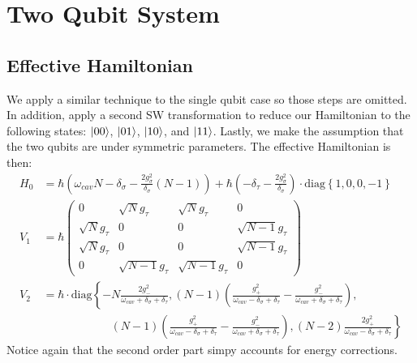 \documentclass[
    preprint,
    amsmath,amssymb,
    aps,
    prb,
    floatfix,
]{revtex4-2}
\begin{document}
    \section{Two Qubit System}
    \subsection{Effective Hamiltonian}
    We apply a similar technique to the single qubit case so those steps are omitted. In addition, apply a second SW transformation to reduce our Hamiltonian to the following states: $\ket{00}$, $\ket{01}$, $\ket{10}$, and $\ket{11}$. Lastly, we make the assumption that the two qubits are under symmetric parameters.
    The effective Hamiltonian is then:
    \begin{align}
        H_0 &= \hbar(\omega_{cav}N-\delta_\sigma-\frac{2g_\sigma^2}{\delta_\sigma}(N-1))+\hbar(-\delta_\tau-\frac{2g_\sigma^2}{\delta_\sigma})\cdot\textrm{diag}\left\{1,0,0,-1\right\} \\
        V_1 &= \hbar\begin{pmatrix}
            0 & \sqrt{N}g_\tau & \sqrt{N}g_\tau & 0 \\
            \sqrt{N}g_\tau &0 & 0 & \sqrt{N-1}g_\tau \\
            \sqrt{N}g_\tau & 0 & 0 & \sqrt{N-1}g_\tau \\
            0              & \sqrt{N-1}g_\tau & \sqrt{N-1}g_\tau & 0
        \end{pmatrix} \\
        V_2 &= \hbar\cdot\textrm{diag}\left\{ -N\frac{2g_-^2}{\omega_{cav}+\delta_\sigma+\delta_\tau},(N-1)(\frac{g_+^2}{\omega_{cav}-\delta_\sigma+\delta_\tau}-\frac{g_-^2}{\omega_{cav}+\delta_\sigma+\delta_\tau}), \right.\nonumber\\
        &\qquad\qquad\qquad \left. (N-1)(\frac{g_+^2}{\omega_{cav}-\delta_\sigma+\delta_\tau}-\frac{g_-^2}{\omega_{cav}+\delta_\sigma+\delta_\tau}),(N-2)\frac{2g_+^2}{\omega_{cav}-\delta_\sigma+\delta_\tau} \right\}
    \end{align}
    Notice again that the second order part simpy accounts for energy corrections.
\end{document}
